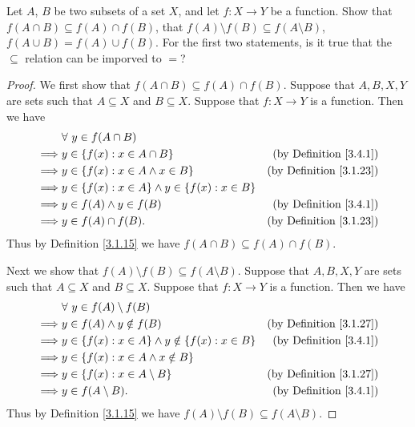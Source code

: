 \begin{exercise}\label{ex 3.4.3}
Let \(A\), \(B\) be two subsets of a set \(X\), and let \(f : X \to Y\) be a function.
Show that \(f(A \cap B) \subseteq f(A) \cap f(B)\), that \(f(A) \setminus f(B) \subseteq f(A \setminus B)\), \(f(A \cup B) = f(A) \cup f(B)\).
For the first two statements, is it true that the \(\subseteq\) relation can be imporved to \(=\)?
\end{exercise}

\begin{proof}
We first show that \(f(A \cap B) \subseteq f(A) \cap f(B)\).
Suppose that \(A, B, X, Y\) are sets such that \(A \subseteq X\) and \(B \subseteq X\).
Suppose that \(f : X \to Y\) is a function.
Then we have
\begin{align*}
& \forall\ y \in f(A \cap B) \\
\implies & y \in \{f(x) : x \in A \cap B\} & \text{(by Definition \ref{3.4.1})} \\
\implies & y \in \{f(x) : x \in A \land x \in B\} & \text{(by Definition \ref{3.1.23})} \\
\implies & y \in \{f(x) : x \in A\} \land y \in \{f(x) : x \in B\} \\
\implies & y \in f(A) \land y \in f(B) & \text{(by Definition \ref{3.4.1})} \\
\implies & y \in f(A) \cap f(B). & \text{(by Definition \ref{3.1.23})}
\end{align*}
Thus by Definition \ref{3.1.15} we have \(f(A \cap B) \subseteq f(A) \cap f(B)\).

Next we show that \(f(A) \setminus f(B) \subseteq f(A \setminus B)\).
Suppose that \(A, B, X, Y\) are sets such that \(A \subseteq X\) and \(B \subseteq X\).
Suppose that \(f : X \to Y\) is a function.
Then we have
\begin{align*}
& \forall\ y \in f(A) \setminus f(B) \\
\implies & y \in f(A) \land y \notin f(B) & \text{(by Definition \ref{3.1.27})} \\
\implies & y \in \{f(x) : x \in A\} \land y \notin \{f(x) : x \in B\} & \text{(by Definition \ref{3.4.1})} \\
\implies & y \in \{f(x) : x \in A \land x \notin B\} \\
\implies & y \in \{f(x) : x \in A \setminus B\} & \text{(by Definition \ref{3.1.27})} \\
\implies & y \in f(A \setminus B). & \text{(by Definition \ref{3.4.1})}
\end{align*}
Thus by Definition \ref{3.1.15} we have \(f(A) \setminus f(B) \subseteq f(A \setminus B)\).


\end{proof}
